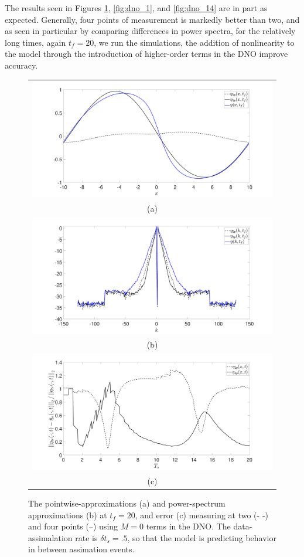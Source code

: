 The results seen in Figures \ref{fig:dno_0}, \ref{fig:dno_1}, and \ref{fig:dno_14} are in part as expected.  Generally, four points of measurement is markedly better than two, and as seen in particular by comparing differences in power spectra, for the relatively long times, again $t_{f}=20$, we run the simulations, the addition of nonlinearity to the model through the introduction of higher-order terms in the DNO improve accuracy.  
\begin{figure}[!h]
	\begin{tabular}{c}
		\includegraphics[width=.8\textwidth]{./Images/pwise_sig_pt1_srate_pt5_Nens_200_Np_4_tf_20_M_0}\\
		(a)\\
		\includegraphics[width=.8\textwidth]{./Images/pspec_sig_pt1_srate_pt5_Nens_200_Np_4_tf_20_M_0}\\
		(b)\\
		\includegraphics[width=.8\textwidth]{./Images/error_sig_pt1_srate_pt5_Nens_200_Np_4_tf_20_M_0}\\
		(c)	
	\end{tabular}	
	\caption{The pointwise-approximations (a) and power-spectrum approximations (b) at $t_{f}=20$, and error (c) measuring at two (- -) and four points (--) using $M=0$ terms in the DNO.  The data-assimalation rate is $\delta t_{s}=.5$, so that the model is predicting behavior in between assimation events.}
	\label{fig:dno_0}
\end{figure}

